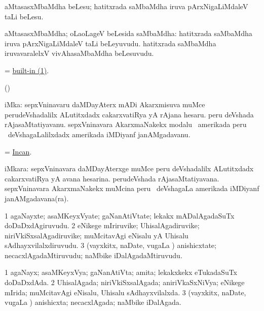 \bentry
{}
\gl{\sakirx}
\bmng
aMtasasxMbaMdha beLesu; hatitxrada saMbaMdha iruva pArxNigaLiMdaleV taLi beLesu. 
\emng
\eentry

\bentry
{}
\gl{\nA}
\bmng
aMtasasxMbaMdha; oLaoLageV beLesida saMbaMdha: 
\banum
{} hatitxrada saMbaMdha iruva pArxNigaLiMdaleV taLi beLeyuvudu. 
 hatitxrada saMbaMdha iruvavaralelxV vivAhasaMbaMdha beLesuvudu. 
\eanum
\emng
\eentry

\bentry
{}
\gl{\gu}
\bmng
= \hyperref{kandict_b.pdf}{B}{built-in}{built-in (1)}. 
\emng
\eentry

\bentry
{}
\gl{\saMkiSx}
\bmng
(\ame)  
\emng
\eentry

\bentry
{}
\gl{\nA}
\bmng
iMka: 
\banum
{} sepxVninavaru daMDayAterx mADi Akarxmisuva muMce perudeVshadalilx ALutitxdadx cakarxvatiRya yA rAjana hesaru. 
 peru deVshada rAjasaMtatiyavanu. 
 sepxVninavara AkarxmaNakekx modalu \da\ amerikada peru \mo\ deVshagaLalilxdadx amerikada iMDiyanf janAMgadavanu. 
\eanum
\emng
\eentry

\bentry
{}
\gl{\gu}
\bmng
 = \hyperlink{Incan}{Incan}. 
\emng
\eentry

\bentry
{}
\gl{\gu}
\bmng
iMkara: 
\banum
{} sepxVninavara daMDayAterxge muMce peru deVshadalilx ALutitxdadx cakarxvatiRya yA avana hesarina. 
 perudeVshada rAjasaMtatiyavana. 
 sepxVninavara AkarxmaNakekx muMcina peru \mo\ deVshagaLa amerikada iMDiyanf janAMgadavana(ra). 
\eanum
\emng
\eentry

\bentry
{}
\gl{\nA}
\bmng
\bnum
\num{1} agaNayxte; asaMKeyxVyate; gaNanAtiVtate; lekakx mADalAgadaSuTx doDaDxdAgiruvudu. 
\num{2} eNikege mIriruvike; UhisalAgadiruvike; niriVkiSxsalAgadiruvike; muMcitavAgi eNisalu yA Uhisalu sAdhayxvilalxdiruvudu. 
\num{3} (vayxkitx, naDate, \mo vugaLa \vi) anishicxtate; necacxlAgadaMtiruvudu; naMbike iDalAgadaMtiruvudu. 
\enum
\emng
\eentry

\bentry
{}
\gl{\gu}
\bmng
\bnum
\num{1} agaNayx; asaMKeyxVya; gaNanAtiVta; amita; lekakxkekx eTukadaSuTx doDaDxdAda. 
\num{2} UhisalAgada; niriVkiSxsalAgada; aniriVkaSxNiVya; eNikege mIrida; muMcitavAgi eNisalu, Uhisalu sAdhayxvilalxda. 
\num{3} (vayxkitx, naDate, \mo vugaLa \vi) anishicxta; necacxlAgada; naMbike iDalAgada. 
\enum
\emng
\eentry

